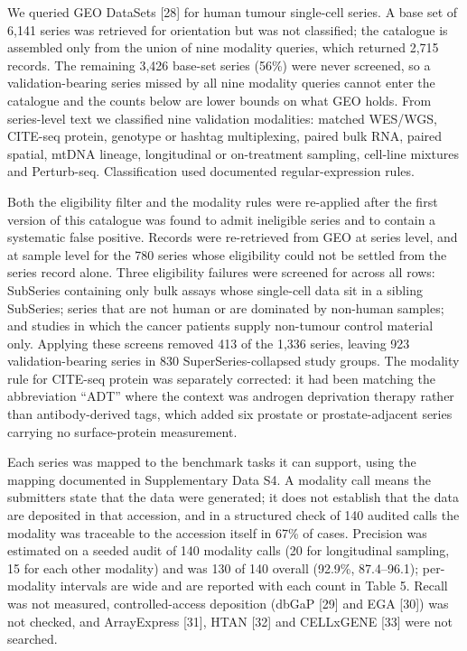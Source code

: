 \documentclass[11pt]{article}
\begin{document}
We queried GEO DataSets {[}28{]} for human tumour single-cell series. A
base set of 6,141 series was retrieved for orientation but was not
classified; the catalogue is assembled only from the union of nine
modality queries, which returned 2,715 records. The remaining 3,426
base-set series (56\%) were never screened, so a validation-bearing
series missed by all nine modality queries cannot enter the catalogue
and the counts below are lower bounds on what GEO holds. From
series-level text we classified nine validation modalities: matched
WES/WGS, CITE-seq protein, genotype or hashtag multiplexing, paired bulk
RNA, paired spatial, mtDNA lineage, longitudinal or on-treatment
sampling, cell-line mixtures and Perturb-seq. Classification used
documented regular-expression rules.

Both the eligibility filter and the modality rules were re-applied after
the first version of this catalogue was found to admit ineligible series
and to contain a systematic false positive. Records were re-retrieved
from GEO at series level, and at sample level for the 780 series whose
eligibility could not be settled from the series record alone. Three
eligibility failures were screened for across all rows: SubSeries
containing only bulk assays whose single-cell data sit in a sibling
SubSeries; series that are not human or are dominated by non-human
samples; and studies in which the cancer patients supply non-tumour
control material only. Applying these screens removed 413 of the 1,336
series, leaving 923 validation-bearing series in 830
SuperSeries-collapsed study groups. The modality rule for CITE-seq
protein was separately corrected: it had been matching the abbreviation
``ADT'' where the context was androgen deprivation therapy rather than
antibody-derived tags, which added six prostate or prostate-adjacent
series carrying no surface-protein measurement.

Each series was mapped to the benchmark tasks it can support, using the
mapping documented in Supplementary Data S4. A modality call means the
submitters state that the data were generated; it does not establish
that the data are deposited in that accession, and in a structured check
of 140 audited calls the modality was traceable to the accession itself
in 67\% of cases. Precision was estimated on a seeded audit of 140
modality calls (20 for longitudinal sampling, 15 for each other
modality) and was 130 of 140 overall (92.9\%, 87.4--96.1); per-modality
intervals are wide and are reported with each count in Table 5. Recall
was not measured, controlled-access deposition (dbGaP {[}29{]} and EGA
{[}30{]}) was not checked, and ArrayExpress {[}31{]}, HTAN {[}32{]} and
CELLxGENE {[}33{]} were not searched.
\end{document}
